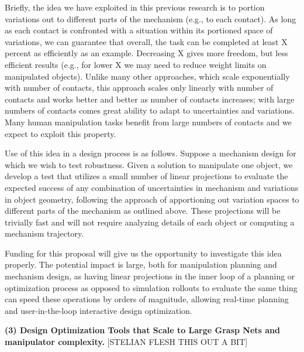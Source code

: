 Briefly, the idea we have exploited in this previous research is to portion variations out to different parts of the mechanism (e.g., to each contact).   As long as each contact is confronted with a situation within its portioned space of variations, we can guarantee that overall, the task can be completed at least X percent as efficiently as an example.   Decreasing X gives more freedom, but less efficient results (e.g., for lower X we may need to reduce weight limits on manipulated objects).   Unlike many other approaches, which scale exponentially with number of contacts, this approach scales only linearly with number of contacts and works better and better as number of contacts increases; with large numbers of contacts comes great ability to adapt to uncertainties and variations.   Many human manipulation tasks benefit from large numbers of contacts and we expect to exploit this property.

Use of this idea in a design process is as follows.   Suppose a mechanism design for which we wish to test robustness.    Given a  solution to manipulate one object, we develop a test that utilizes a small number of linear projections to evaluate the expected success of any combination of uncertainties in mechanism and variations in object geometry, following the approach of apportioning out variation spaces to different parts of the mechanism as outlined above.   These projections will be trivially fast and will not require analyzing details of each object or computing a mechanism trajectory.

Funding for this proposal will give us the opportunity to investigate this idea properly.   The potential impact is large, both for manipulation planning and mechanism design, as having linear projections in the inner loop of a planning or optimization process as opposed to simulation rollouts to evaluate the same thing can speed these operations by orders of magnitude, allowing real-time planning and user-in-the-loop interactive design optimization.

\smallskip\noindent
{\bf (3) Design Optimization Tools that Scale to Large Grasp Nets and manipulator complexity.}   [STELIAN FLESH THIS OUT A BIT]

